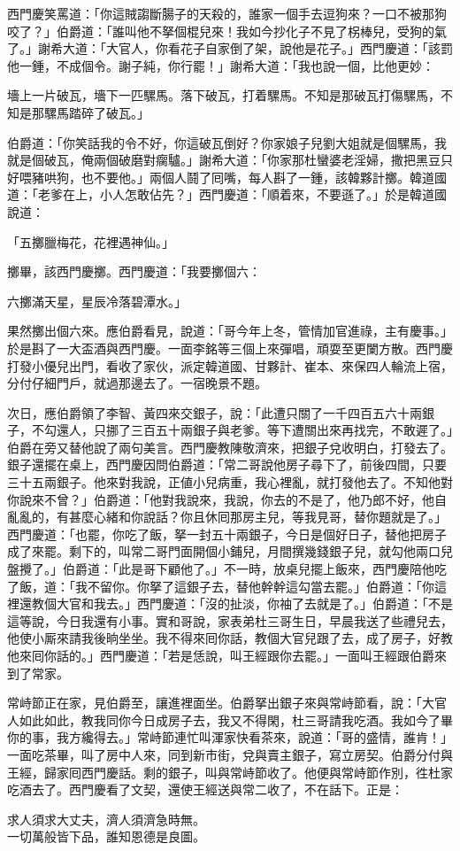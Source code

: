 西門慶笑罵道：「你這賊謅斷腸子的天殺的，誰家一個手去逗狗來？一口不被那狗咬了？」伯爵道：「誰叫他不拏個棍兒來！我如今抄化子不見了柺棒兒，受狗的氣了。」{}謝希大道：「大官人，你看花子自家倒了架，說他是花子。」西門慶道：「該罰他一鍾，不成個令。謝子純，你行罷！」謝希大道：「我也說一個，比他更妙：

\begin{myquote}
墻上一片破瓦，墻下一匹騾馬。落下破瓦，打着騾馬。不知是那破瓦打傷騾馬，不知是那騾馬踏碎了破瓦。」
\end{myquote}

伯爵道：「你笑話我的令不好，你這破瓦倒好？你家娘子兒劉大姐就是個騾馬，我就是個破瓦，俺兩個破磨對瘸驢。」謝希大道：「你家那杜蠻婆老淫婦，撒把黑豆只好喂豬哄狗，也不要他。」兩個人鬪了囘嘴，每人斟了一鍾，該韓夥計擲。韓道國道：「老爹在上，小人怎敢佔先？」西門慶道：「順着來，不要遜了。」於是韓道國說道：

\begin{myquote}
「五擲臘梅花，花裡遇神仙。」
\end{myquote}

擲畢，該西門慶擲。西門慶道：「我要擲個六：

\begin{myquote}
六擲滿天星，星辰冷落碧潭水。」
\end{myquote}

果然擲出個六來。應伯爵看見，說道：「哥今年上冬，管情加官進祿，主有慶事。」{}於是斟了一大盃酒與西門慶。一面李銘等三個上來彈唱，頑耍至更闌方散。西門慶打發小優兒出門，看收了家伙，派定韓道國、甘夥計、崔本、來保四人輪流上宿，分付仔細門戶，就過那邊去了。一宿晚景不題。

次日，應伯爵領了李智、黃四來交銀子，說：「此遭只關了一千四百五六十兩銀子，不勾還人，只挪了三百五十兩銀子與老爹。等下遭關出來再找完，不敢遲了。」伯爵在旁又替他說了兩句美言。西門慶教陳敬濟來，把銀子兌收明白，打發去了。銀子還擺在桌上，西門慶因問伯爵道：「常二哥說他房子尋下了，前後四間，只要三十五兩銀子。他來對我說，正値小兒病重，我心裡亂，就打發他去了。不知他對你說來不曾？」伯爵道：「他對我說來，我說，你去的不是了，他乃郎不好，他自亂亂的，有甚麼心緒和你說話？你且休囘那房主兒，等我見哥，替你題就是了。」西門慶道：「也罷，你吃了飯，拏一封五十兩銀子，今日是個好日子，替他把房子成了來罷。剩下的，叫常二哥門面開個小鋪兒，月間撰幾錢銀子兒，就勾他兩口兒盤攪了。」{}伯爵道：「此是哥下顧他了。」不一時，放桌兒擺上飯來，西門慶陪他吃了飯，道：「我不留你。你拏了這銀子去，替他幹幹這勾當去罷。」伯爵道：「你這裡還教個大官和我去。」西門慶道：「沒的扯淡，你袖了去就是了。」伯爵道：「不是這等說，今日我還有小事。實和哥說，家表弟杜三哥生日，早晨我送了些禮兒去，他使小厮來請我後晌坐坐。我不得來囘你話，教個大官兒跟了去，成了房子，好教他來囘你話的。」西門慶道：「若是恁說，叫王經跟你去罷。」一面叫王經跟伯爵來到了常家。

常峙節正在家，見伯爵至，讓進裡面坐。伯爵拏出銀子來與常峙節看，說：「大官人如此如此，教我同你今日成房子去，我又不得閑，杜三哥請我吃酒。我如今了畢你的事，我方纔得去。」常峙節連忙叫渾家快看茶來，說道：「哥的盛情，誰肯！」一面吃茶畢，叫了房中人來，同到新市街，兌與賣主銀子，寫立房契。伯爵分付與王經，歸家囘西門慶話。剩的銀子，叫與常峙節收了。他便與常峙節作別，徃杜家吃酒去了。西門慶看了文契，還使王經送與常二收了，不在話下。正是：

\begin{myquote}
求人須求大丈夫，濟人須濟急時無。\\一切萬般皆下品，誰知恩德是良圖。
\end{myquote}

